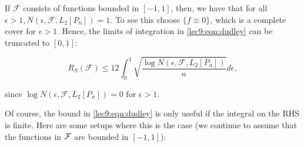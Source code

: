 \begin{remark}
If $\mathcal{F}$ consists of functions bounded in $[-1,1]$, then, we have that for all $\epsilon > 1, N(\epsilon, \mathcal{F}, L_2[P_n])=1$. To see this choose $\{f\equiv 0\}$, which is a complete cover for $\epsilon>1$. Hence, the limits of integration in \eqref{lec9:eqn:dudley} can be truncated to $[0,1]$:
    
    \begin{equation}
    R_S(\mathcal{F})\leq 12\int_{0}^{1}\sqrt{\frac{\log N(\epsilon, \mathcal{F}, L_2[P_n])}{n}}d\epsilon,
    \end{equation}
    
since $\log N(\epsilon, \mathcal{F}, L_2[P_n])=0$ for $\epsilon >1$.
\end{remark}


Of course, the bound in \eqref{lec9:eqn:dudley} is only useful if the integral on the RHS is finite. Here are some setups where this is the case (we continue to assume that the functions in $\mathcal F$ are bounded in $[-1, 1]$):

